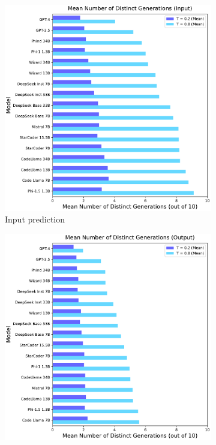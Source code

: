\begin{figure}[H]
     \centering
     \begin{subfigure}[b]{0.49\textwidth}
         \centering
         \includegraphics[width=\textwidth]{figs/diversity/diversity_freq_input.pdf}
         \caption{Input prediction}
         \label{fig:sample-diversity-direct-input}
     \end{subfigure}
     \begin{subfigure}[b]{0.49\textwidth}
         \centering
         \includegraphics[width=\textwidth]{figs/diversity/diversity_freq_output.pdf}

\end{subfigure}
\end{figure}
